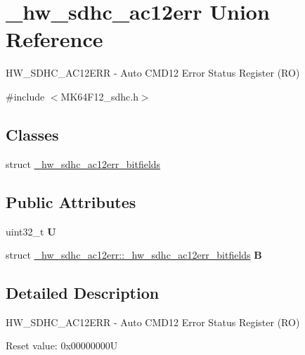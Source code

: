 \hypertarget{union__hw__sdhc__ac12err}{}\section{\+\_\+hw\+\_\+sdhc\+\_\+ac12err Union Reference}
\label{union__hw__sdhc__ac12err}


H\+W\+\_\+\+S\+D\+H\+C\+\_\+\+A\+C12\+E\+RR -\/ Auto C\+M\+D12 Error Status Register (RO)  




{\ttfamily \#include $<$M\+K64\+F12\+\_\+sdhc.\+h$>$}

\subsection*{Classes}
\begin{DoxyCompactItemize}
\item 
struct \hyperlink{struct__hw__sdhc__ac12err_1_1__hw__sdhc__ac12err__bitfields}{\+\_\+hw\+\_\+sdhc\+\_\+ac12err\+\_\+bitfields}
\end{DoxyCompactItemize}
\subsection*{Public Attributes}
\begin{DoxyCompactItemize}
\item 
uint32\+\_\+t {\bfseries U}\hypertarget{union__hw__sdhc__ac12err_aa5eaf9f100481cf4e04dbad59a26d57e}{}\label{union__hw__sdhc__ac12err_aa5eaf9f100481cf4e04dbad59a26d57e}

\item 
struct \hyperlink{struct__hw__sdhc__ac12err_1_1__hw__sdhc__ac12err__bitfields}{\+\_\+hw\+\_\+sdhc\+\_\+ac12err\+::\+\_\+hw\+\_\+sdhc\+\_\+ac12err\+\_\+bitfields} {\bfseries B}\hypertarget{union__hw__sdhc__ac12err_a4b462e437e658b715bb94318c32c8444}{}\label{union__hw__sdhc__ac12err_a4b462e437e658b715bb94318c32c8444}

\end{DoxyCompactItemize}


\subsection{Detailed Description}
H\+W\+\_\+\+S\+D\+H\+C\+\_\+\+A\+C12\+E\+RR -\/ Auto C\+M\+D12 Error Status Register (RO) 

Reset value\+: 0x00000000U

